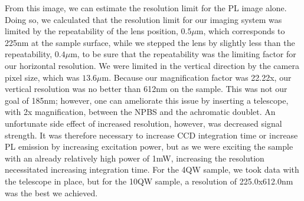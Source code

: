 \indent From this image, we can estimate the resolution limit for the PL image alone. Doing so, we calculated that the resolution limit for our imaging system was limited by the repeatability of the lens position, $0.5\mu$m, which corresponds to 225nm at the sample surface, while we stepped the lens by slightly less than the repeatability, $0.4\mu$m, to be sure that the repeatability was the limiting factor for our horizontal resolution. We were limited in the vertical direction by the camera pixel size, which was $13.6\mu$m. Because our magnification factor was 22.22x, our vertical resolution was no better than 612nm on the sample. This was not our goal of 185nm; however, one can ameliorate this issue by inserting a telescope, with 2x magnification, between the NPBS and the achromatic doublet. An unfortunate side effect of increased resolution, however, was decreased signal strength. It was therefore necessary to increase CCD integration time or increase PL emission by increasing excitation power, but as we were exciting the sample with an already relatively high power of 1mW, increasing the resolution necessitated increasing integration time. For the 4QW sample, we took data with the telescope in place, but for the 10QW sample, a resolution of 225.0x612.0nm was the best we achieved. 
 


